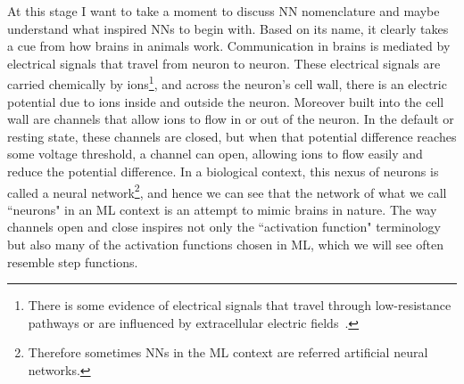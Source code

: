 At this stage I want to take a moment to discuss NN nomenclature and maybe
understand what inspired NNs to begin with. 
Based on its name, it clearly takes a cue from how
brains in animals work. Communication in brains is mediated by electrical
signals that travel from neuron to neuron. These electrical signals are
carried chemically by ions\footnote{There is some evidence
of electrical signals that travel through low-resistance pathways or
are influenced by extracellular electric fields~\cite{faber_two_2018}.},
and across the neuron's cell wall, there is an electric potential due to ions 
inside and outside the neuron. Moreover built into the cell wall are channels
that allow ions to flow in or out of the neuron. In the default or resting
state, these channels are closed, but when that potential difference reaches
some voltage threshold, a channel can open, allowing ions to flow easily
and reduce the potential difference. In a biological context, this
nexus of neurons is called a neural network\footnote{Therefore sometimes NNs
in the ML context are referred artificial neural networks.}, and hence
we can see that the network of what we call ``neurons" in an ML context
is an attempt to mimic brains in nature. The way channels open and close
 inspires not only the ``activation function" terminology but also many of 
the activation functions chosen in ML, which we will see often resemble 
step functions.

